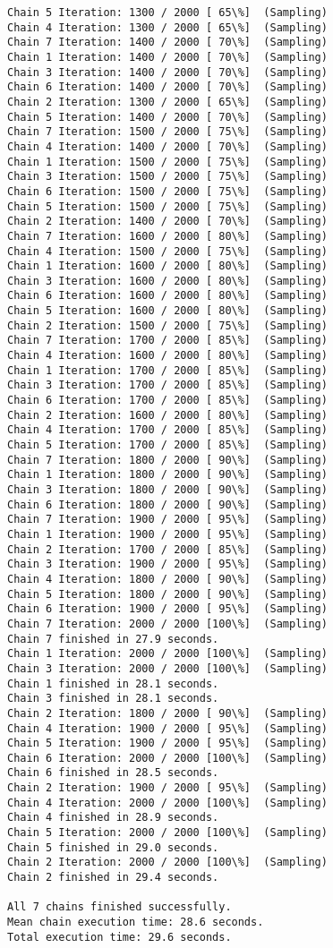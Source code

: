 \documentclass[11pt]{article}
\begin{document}
\begin{Verbatim}[commandchars=\\\{\}]
Chain 5 Iteration: 1300 / 2000 [ 65\%]  (Sampling)
Chain 4 Iteration: 1300 / 2000 [ 65\%]  (Sampling)
Chain 7 Iteration: 1400 / 2000 [ 70\%]  (Sampling)
Chain 1 Iteration: 1400 / 2000 [ 70\%]  (Sampling)
Chain 3 Iteration: 1400 / 2000 [ 70\%]  (Sampling)
Chain 6 Iteration: 1400 / 2000 [ 70\%]  (Sampling)
Chain 2 Iteration: 1300 / 2000 [ 65\%]  (Sampling)
Chain 5 Iteration: 1400 / 2000 [ 70\%]  (Sampling)
Chain 7 Iteration: 1500 / 2000 [ 75\%]  (Sampling)
Chain 4 Iteration: 1400 / 2000 [ 70\%]  (Sampling)
Chain 1 Iteration: 1500 / 2000 [ 75\%]  (Sampling)
Chain 3 Iteration: 1500 / 2000 [ 75\%]  (Sampling)
Chain 6 Iteration: 1500 / 2000 [ 75\%]  (Sampling)
Chain 5 Iteration: 1500 / 2000 [ 75\%]  (Sampling)
Chain 2 Iteration: 1400 / 2000 [ 70\%]  (Sampling)
Chain 7 Iteration: 1600 / 2000 [ 80\%]  (Sampling)
Chain 4 Iteration: 1500 / 2000 [ 75\%]  (Sampling)
Chain 1 Iteration: 1600 / 2000 [ 80\%]  (Sampling)
Chain 3 Iteration: 1600 / 2000 [ 80\%]  (Sampling)
Chain 6 Iteration: 1600 / 2000 [ 80\%]  (Sampling)
Chain 5 Iteration: 1600 / 2000 [ 80\%]  (Sampling)
Chain 2 Iteration: 1500 / 2000 [ 75\%]  (Sampling)
Chain 7 Iteration: 1700 / 2000 [ 85\%]  (Sampling)
Chain 4 Iteration: 1600 / 2000 [ 80\%]  (Sampling)
Chain 1 Iteration: 1700 / 2000 [ 85\%]  (Sampling)
Chain 3 Iteration: 1700 / 2000 [ 85\%]  (Sampling)
Chain 6 Iteration: 1700 / 2000 [ 85\%]  (Sampling)
Chain 2 Iteration: 1600 / 2000 [ 80\%]  (Sampling)
Chain 4 Iteration: 1700 / 2000 [ 85\%]  (Sampling)
Chain 5 Iteration: 1700 / 2000 [ 85\%]  (Sampling)
Chain 7 Iteration: 1800 / 2000 [ 90\%]  (Sampling)
Chain 1 Iteration: 1800 / 2000 [ 90\%]  (Sampling)
Chain 3 Iteration: 1800 / 2000 [ 90\%]  (Sampling)
Chain 6 Iteration: 1800 / 2000 [ 90\%]  (Sampling)
Chain 7 Iteration: 1900 / 2000 [ 95\%]  (Sampling)
Chain 1 Iteration: 1900 / 2000 [ 95\%]  (Sampling)
Chain 2 Iteration: 1700 / 2000 [ 85\%]  (Sampling)
Chain 3 Iteration: 1900 / 2000 [ 95\%]  (Sampling)
Chain 4 Iteration: 1800 / 2000 [ 90\%]  (Sampling)
Chain 5 Iteration: 1800 / 2000 [ 90\%]  (Sampling)
Chain 6 Iteration: 1900 / 2000 [ 95\%]  (Sampling)
Chain 7 Iteration: 2000 / 2000 [100\%]  (Sampling)
Chain 7 finished in 27.9 seconds.
Chain 1 Iteration: 2000 / 2000 [100\%]  (Sampling)
Chain 3 Iteration: 2000 / 2000 [100\%]  (Sampling)
Chain 1 finished in 28.1 seconds.
Chain 3 finished in 28.1 seconds.
Chain 2 Iteration: 1800 / 2000 [ 90\%]  (Sampling)
Chain 4 Iteration: 1900 / 2000 [ 95\%]  (Sampling)
Chain 5 Iteration: 1900 / 2000 [ 95\%]  (Sampling)
Chain 6 Iteration: 2000 / 2000 [100\%]  (Sampling)
Chain 6 finished in 28.5 seconds.
Chain 2 Iteration: 1900 / 2000 [ 95\%]  (Sampling)
Chain 4 Iteration: 2000 / 2000 [100\%]  (Sampling)
Chain 4 finished in 28.9 seconds.
Chain 5 Iteration: 2000 / 2000 [100\%]  (Sampling)
Chain 5 finished in 29.0 seconds.
Chain 2 Iteration: 2000 / 2000 [100\%]  (Sampling)
Chain 2 finished in 29.4 seconds.

All 7 chains finished successfully.
Mean chain execution time: 28.6 seconds.
Total execution time: 29.6 seconds.

    \end{Verbatim}
\end{document}
